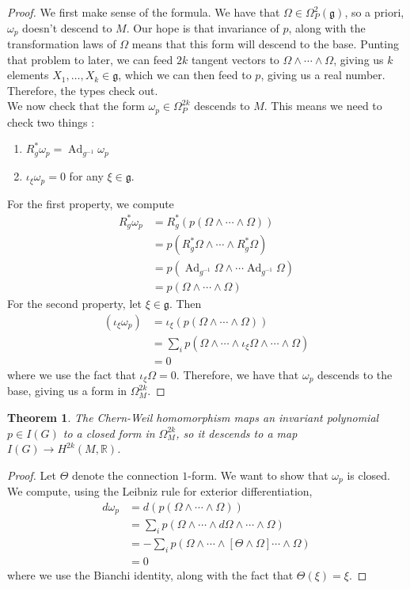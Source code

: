 \documentclass[psamsfonts, 12pt]{amsart}
\newtheorem{thm}{Theorem}[section]
\theoremstyle{definition}
\theoremstyle{remark}
\newcommand{\R}{\mathbb{R}}
\newcommand{\g}{\mathfrak{g}}
\newcommand{\inv}{^{-1}}
\DeclareMathOperator{\Ad}{Ad}
\begin{document}
\begin{proof}
We first make sense of the formula. We have that $\Omega \in \Omega^2_P(\g)$, so
a priori, $\omega_p$ doesn't descend to $M$. Our hope is that invariance of $p$, along
with the transformation laws of $\Omega$ means that this form will descend to the base.
Punting that problem to later, we can feed $2k$ tangent vectors to
$\Omega \wedge\cdots\wedge \Omega$, giving us $k$ elements $X_1,\ldots, X_k \in \g$, which
we can then feed to $p$, giving us a real number. Therefore, the types check out. \\

We now check that the form $\omega_p \in \Omega^{2k}_P$ descends to $M$. This means we
need to check two things :
\begin{enumerate}
  \item $R_g^*\omega_p = \Ad_{g\inv}\omega_p$
  \item $\iota_\xi\omega_p = 0$ for any $\xi \in \g$.
\end{enumerate}
For the first property, we compute
\begin{align*}
R_g^*\omega_p &= R_g^*(p(\Omega \wedge\cdots\wedge\Omega)) \\
&= p(R_g^*\Omega \wedge \cdots \wedge R_g^*\Omega) \\
&= p(\Ad_{g\inv}\Omega \wedge\cdots\Ad_{g\inv}\Omega) \\
&= p(\Omega\wedge\cdots\wedge\Omega)
\end{align*}
For the second property, let $\xi\in \g$. Then
\begin{align*}
(\iota_\xi\omega_p)
&= \iota_\xi(p(\Omega\wedge\cdots\wedge\Omega)) \\
&= \sum_i p(\Omega\wedge\cdots\wedge\iota_\xi\Omega\wedge\cdots\wedge\Omega) \\
&= 0
\end{align*}
where we use the fact that $\iota_\xi\Omega = 0$. Therefore, we have that
$\omega_p$ descends to the base, giving us a form in $\Omega^{2k}_M$.
\end{proof}
%
\begin{thm}
The Chern-Weil homomorphism maps an invariant polynomial $p \in I(G)$ to a closed
form in $\Omega^{2k}_M$, so it descends to a map $I(G) \to H^{2k}(M,\R)$.
\end{thm}
%
\begin{proof}
Let $\Theta$ denote the connection $1$-form. We want to show that
$\omega_p$ is closed. We compute, using the Leibniz rule for exterior differentiation,
\begin{align*}
d\omega_p &= d(p(\Omega \wedge\cdots\wedge\Omega)) \\
&= \sum_i p(\Omega\wedge\cdots\wedge d\Omega\wedge\cdots\wedge\Omega) \\
&= -\sum_i p(\Omega\wedge\cdots\wedge [\Theta\wedge\Omega]\cdots\wedge\Omega) \\
&= 0
\end{align*}
where we use the Bianchi identity, along with the fact that $\Theta(\xi) = \xi$.
\end{proof}
%
\end{document}
